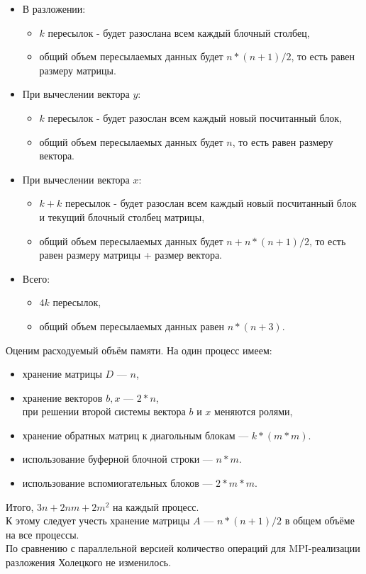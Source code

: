 \documentclass[a4paper,12pt]{article}
\begin{document}
    \begin{itemize}
        \item В разложении:
        \begin{itemize}
            \item $k$ пересылок - будет разослана всем каждый блочный столбец,
            \item общий объем пересылаемых данных будет $n*(n+1)/2$, то есть равен размеру матрицы.
        \end{itemize}
        \item При вычеслении вектора $y$:
        \begin{itemize}
            \item $k$ пересылок - будет разослан всем каждый новый посчитанный блок,
            \item общий объем пересылаемых данных будет $n$, то есть равен размеру вектора.
        \end{itemize}
        \item При вычеслении вектора $x$:
        \begin{itemize}
            \item $k + k$ пересылок - будет разослан всем каждый новый посчитанный блок
            и текущий блочный столбец матрицы,
            \item общий объем пересылаемых данных будет $n + n*(n+1)/2$, 
            то есть равен размеру матрицы + размер вектора.
        \end{itemize}
        \item Всего:
        \begin{itemize}
            \item $4k$ пересылок,
            \item общий объем пересылаемых данных равен $n*(n+3)$.
        \end{itemize}
    \end{itemize}
    
    \bigskip
    Оценим расходуемый объём памяти. На один процесс имеем:
    \begin{itemize}
        \item хранение матрицы $D$ --- $n$,
        \item хранение векторов $b, x$  --- $2* n$, \\
        при решении второй системы вектора $b$ и $x$ меняются ролями,
        \item хранение обратных матриц к диагольным блокам --- $k * (m * m)$.
        \item использование буферной блочной строки  --- $n * m$.
        \item использование вспомиогательных блоков  --- $2 * m * m$.
    \end{itemize}
    
    Итого, $3n + 2nm + 2m^2$ на каждый процесс. \\
    К этому следует учесть хранение матрицы $A$ --- $n*(n+1)/2$ в общем объёме на все процессы. \\
    
    По сравнению с параллельной версией количество операций для MPI-реализации 
    разложения Холецкого не изменилось.
\end{document}
